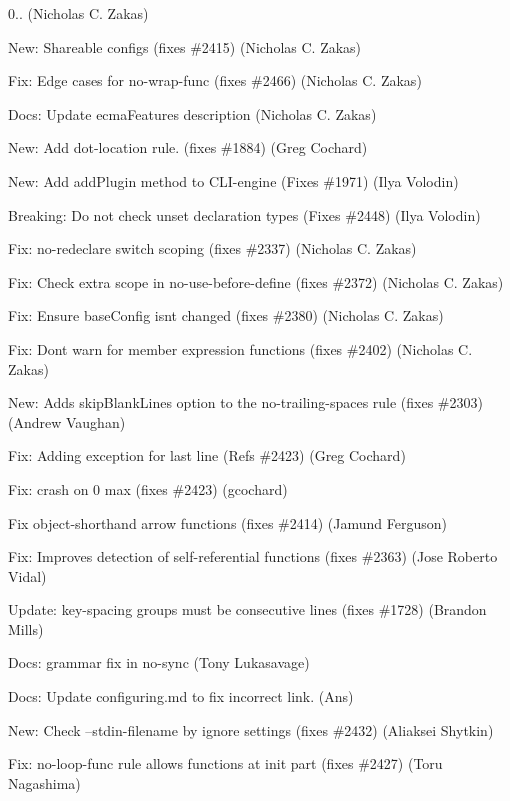 \begin{DoxyItemize}
\item 0.. (Nicholas C. Zakas)
\item New\+: Shareable configs (fixes \#2415) (Nicholas C. Zakas)
\item Fix\+: Edge cases for no-\/wrap-\/func (fixes \#2466) (Nicholas C. Zakas)
\item Docs\+: Update ecma\+Features description (Nicholas C. Zakas)
\item New\+: Add dot-\/location rule. (fixes \#1884) (Greg Cochard)
\item New\+: Add add\+Plugin method to C\+L\+I-\/engine (Fixes \#1971) (Ilya Volodin)
\item Breaking\+: Do not check unset declaration types (Fixes \#2448) (Ilya Volodin)
\item Fix\+: no-\/redeclare switch scoping (fixes \#2337) (Nicholas C. Zakas)
\item Fix\+: Check extra scope in no-\/use-\/before-\/define (fixes \#2372) (Nicholas C. Zakas)
\item Fix\+: Ensure base\+Config isn\textquotesingle{}t changed (fixes \#2380) (Nicholas C. Zakas)
\item Fix\+: Don\textquotesingle{}t warn for member expression functions (fixes \#2402) (Nicholas C. Zakas)
\item New\+: Adds skip\+Blank\+Lines option to the no-\/trailing-\/spaces rule (fixes \#2303) (Andrew Vaughan)
\item Fix\+: Adding exception for last line (Refs \#2423) (Greg Cochard)
\item Fix\+: crash on 0 max (fixes \#2423) (gcochard)
\item Fix object-\/shorthand arrow functions (fixes \#2414) (Jamund Ferguson)
\item Fix\+: Improves detection of self-\/referential functions (fixes \#2363) (Jose Roberto Vidal)
\item Update\+: key-\/spacing groups must be consecutive lines (fixes \#1728) (Brandon Mills)
\item Docs\+: grammar fix in no-\/sync (Tony Lukasavage)
\item Docs\+: Update configuring.\+md to fix incorrect link. (Ans)
\item New\+: Check --stdin-\/filename by ignore settings (fixes \#2432) (Aliaksei Shytkin)
\item Fix\+: {\ttfamily no-\/loop-\/func} rule allows functions at init part (fixes \#2427) (Toru Nagashima)

\end{DoxyItemize}
